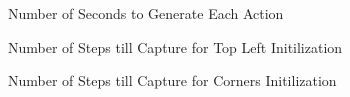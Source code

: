 \documentclass[11pt]{article}
\begin{document}
\begin{figure}[H]
	\caption{Number of Seconds to Generate Each Action}
	\label{fig:numsecondsaction}
\end{figure}

\begin{figure}[H]
	\caption{Number of Steps till Capture for Top Left Initilization}
	\label{fig:numsecondinitialization}
\end{figure}

\begin{figure}[H]
	\caption{Number of Steps till Capture for Corners Initilization}
	\label{fig:numberstepscornerscore}
\end{figure}
\end{document}
